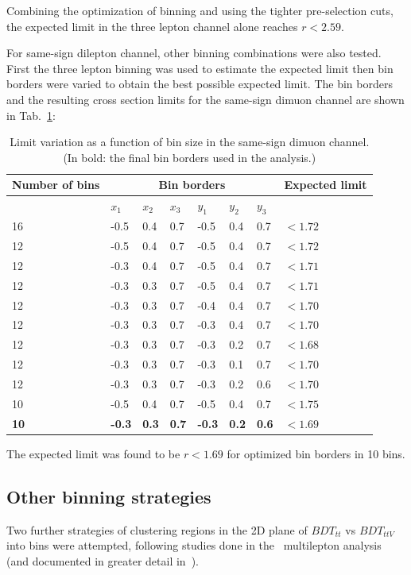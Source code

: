 Combining the optimization of binning and using the tighter pre-selection cuts, the expected limit in the three lepton channel alone reaches $r<2.59$.

For same-sign dilepton channel, other binning combinations were also tested. 
First the three lepton binning was used to estimate the expected limit then bin borders were varied to obtain the best possible expected limit.
The bin borders and the resulting cross section limits for the same-sign dimuon channel are shown in Tab.~\ref{bin_limits_2lss}:

\begin{table}[h!]
\centering
\begin{tabular}{llllllll}
Number of bins  & \multicolumn{6}{c}{Bin borders}  & Expected limit \\\hline
                &$x_1$&$x_2$&$x_3$&$y_1$&$y_2$&$y_3$&\\\hline
16              &-0.5 & 0.4 & 0.7 &-0.5 & 0.4 & 0.7 & $<1.72$\\
12              &-0.5 & 0.4 & 0.7 &-0.5 & 0.4 & 0.7 & $<1.72$\\
12              &-0.3 & 0.4 & 0.7 &-0.5 & 0.4 & 0.7 & $<1.71$\\
12              &-0.3 & 0.3 & 0.7 &-0.5 & 0.4 & 0.7 & $<1.71$\\
12              &-0.3 & 0.3 & 0.7 &-0.4 & 0.4 & 0.7 & $<1.70$\\
12              &-0.3 & 0.3 & 0.7 &-0.3 & 0.4 & 0.7 & $<1.70$\\
12              &-0.3 & 0.3 & 0.7 &-0.3 & 0.2 & 0.7 & $<1.68$\\
12              &-0.3 & 0.3 & 0.7 &-0.3 & 0.1 & 0.7 & $<1.70$\\
12              &-0.3 & 0.3 & 0.7 &-0.3 & 0.2 & 0.6 & $<1.70$\\
10              &-0.5 & 0.4 & 0.7 &-0.5 & 0.4 & 0.7 & $<1.75$\\
\textbf{10}     &\textbf{-0.3} &\textbf{ 0.3} &\textbf{ 0.7} &\textbf{-0.3} &\textbf{ 0.2} &\textbf{ 0.6} &$\mathbf{<1.69}$\\\hline
\end{tabular}
\caption{Limit variation as a function of bin size in the same-sign dimuon channel. (In bold: the final bin borders used in the analysis.)}
\label{bin_limits_2lss}
\end{table}

The expected limit was found to be $r<1.69$ for optimized bin borders in 10 bins.


\subsection{Other binning strategies}
Two further strategies of clustering regions in the 2D plane of $BDT_{tt}$ vs $BDT_{ttV}$ into bins were attempted, following studies done in the \ttH\ multilepton analysis (and documented in greater detail in~\cite{CMS_AN_2017-029}).


